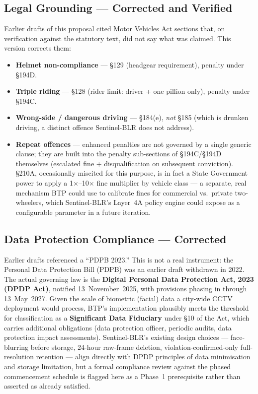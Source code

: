 \documentclass[11pt,a4paper]{article}
\begin{document}
\subsection*{Legal Grounding --- Corrected and Verified}

Earlier drafts of this proposal cited Motor Vehicles Act sections that, on verification against the statutory text, did not say what was claimed. This version corrects them:

\begin{itemize}[leftmargin=1.8em, itemsep=0.3em]
    \item \textbf{Helmet non-compliance} --- \S129 (headgear requirement), penalty under \S194D.
    \item \textbf{Triple riding} --- \S128 (rider limit: driver + one pillion only), penalty under \S194C.
    \item \textbf{Wrong-side / dangerous driving} --- \S184(e), \emph{not} \S185 (which is drunken driving, a distinct offence Sentinel-BLR does not address).
    \item \textbf{Repeat offences} --- enhanced penalties are not governed by a single generic clause; they are built into the penalty sub-sections of \S194C/\S194D themselves (escalated fine + disqualification on subsequent conviction). \S210A, occasionally miscited for this purpose, is in fact a State Government power to apply a 1$\times$--10$\times$ fine multiplier by vehicle class --- a separate, real mechanism BTP could use to calibrate fines for commercial vs.\ private two-wheelers, which Sentinel-BLR's Layer~4A policy engine could expose as a configurable parameter in a future iteration.
\end{itemize}

\subsection*{Data Protection Compliance --- Corrected}

Earlier drafts referenced a ``PDPB 2023.'' This is not a real instrument: the Personal Data Protection Bill (PDPB) was an earlier draft withdrawn in 2022. The actual governing law is the \textbf{Digital Personal Data Protection Act, 2023 (DPDP Act)}, notified 13~November~2025, with provisions phasing in through 13~May~2027. Given the scale of biometric (facial) data a city-wide CCTV deployment would process, BTP's implementation plausibly meets the threshold for classification as a \textbf{Significant Data Fiduciary} under \S10 of the Act, which carries additional obligations (data protection officer, periodic audits, data protection impact assessments). Sentinel-BLR's existing design choices --- face-blurring before storage, 24-hour raw-frame deletion, violation-confirmed-only full-resolution retention --- align directly with DPDP principles of data minimisation and storage limitation, but a formal compliance review against the phased commencement schedule is flagged here as a Phase~1 prerequisite rather than asserted as already satisfied.
\end{document}

